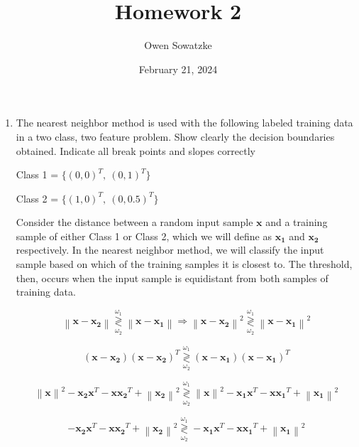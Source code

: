 \documentclass[fleqn]{article}
\title{Homework 2}
\author{Owen Sowatzke}
\date{February 21, 2024}
\newcommand{\zerodisplayskip}{
	\setlength{\abovedisplayskip}{0pt}%
	\setlength{\belowdisplayskip}{0pt}%
	\setlength{\abovedisplayshortskip}{0pt}%
	\setlength{\belowdisplayshortskip}{0pt}%
	\setlength{\mathindent}{0pt}}
\newcommand{\norm}[1]{\left \lVert #1 \right \rVert}
\begin{document}
	\offinterlineskip
	\setlength{\lineskip}{12pt}
	\zerodisplayskip
	\maketitle
	
	\begin{enumerate}
		\item  The nearest neighbor method is used with the following labeled training data in a two class, two feature problem. Show clearly the decision boundaries obtained. Indicate all break points and slopes correctly
		
		Class 1 = $\{(0,0)^T,\:(0,1)^T\}$
		
		Class 2 = $\{(1,0)^T,\:(0,0.5)^T\}$
		
		Consider the distance between a random input sample $\mathbf{x}$ and a training sample of either Class 1 or Class 2, which we will define as $\mathbf{x_1}$ and $\mathbf{x_2}$ respectively. In the nearest neighbor method, we will classify the input sample based on which of the training samples it is closest to. The threshold, then, occurs when the input sample is equidistant from both samples of training data.
		
		\begin{equation*}
			\norm{\mathbf{x} - \mathbf{x_2}} \overset{\omega_1}{\underset{\omega_2}{\gtrless}} \norm{\mathbf{x} - \mathbf{x_1}} \Rightarrow \norm{\mathbf{x} - \mathbf{x_2}}^2  \overset{\omega_1}{\underset{\omega_2}{\gtrless}} \norm{\mathbf{x} - \mathbf{x_1}}^2
		\end{equation*}
		
		\begin{equation*}
			(\mathbf{x} - \mathbf{x_2})(\mathbf{x} - \mathbf{x_2})^T \overset{\omega_1}{\underset{\omega_2}{\gtrless}} (\mathbf{x} - \mathbf{x_1})(\mathbf{x} - \mathbf{x_1})^T
		\end{equation*}
		
		\begin{equation*}
			\norm{\mathbf{x}}^2 - \mathbf{x_2}\mathbf{x}^T - \mathbf{x}\mathbf{x_2}^T + \norm{\mathbf{x_2}}^2 \overset{\omega_1}{\underset{\omega_2}{\gtrless}} \norm{\mathbf{x}}^2 - \mathbf{x_1}\mathbf{x}^T - \mathbf{x}\mathbf{x_1}^T + \norm{\mathbf{x_1}}^2
		\end{equation*}
		
		\begin{equation*}
			- \mathbf{x_2}\mathbf{x}^T - \mathbf{x}\mathbf{x_2}^T + \norm{\mathbf{x_2}}^2 \overset{\omega_1}{\underset{\omega_2}{\gtrless}} - \mathbf{x_1}\mathbf{x}^T - \mathbf{x}\mathbf{x_1}^T + \norm{\mathbf{x_1}}^2
		\end{equation*}
		

\end{enumerate}
\end{document}
